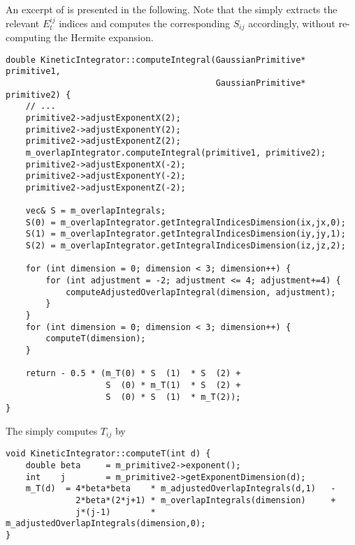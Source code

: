 \documentclass[../../master.tex]{subfiles}
\begin{document}
An excerpt of  is presented in the following. Note that the  simply extracts the relevant $E_t^{ij}$ indices and computes the corresponding $S_{ij}$ accordingly, without re-computing the Hermite expansion.
\begin{lstlisting}[language={[std]c++}]
double KineticIntegrator::computeIntegral(GaussianPrimitive* primitive1,
                                          GaussianPrimitive* primitive2) {
    // ...
    primitive2->adjustExponentX(2);
    primitive2->adjustExponentY(2);
    primitive2->adjustExponentZ(2);
    m_overlapIntegrator.computeIntegral(primitive1, primitive2);
    primitive2->adjustExponentX(-2);
    primitive2->adjustExponentY(-2);
    primitive2->adjustExponentZ(-2);

    vec& S = m_overlapIntegrals;
    S(0) = m_overlapIntegrator.getIntegralIndicesDimension(ix,jx,0);
    S(1) = m_overlapIntegrator.getIntegralIndicesDimension(iy,jy,1);
    S(2) = m_overlapIntegrator.getIntegralIndicesDimension(iz,jz,2);

    for (int dimension = 0; dimension < 3; dimension++) {
        for (int adjustment = -2; adjustment <= 4; adjustment+=4) {
            computeAdjustedOverlapIntegral(dimension, adjustment);
        }
    }
    for (int dimension = 0; dimension < 3; dimension++) {
        computeT(dimension);
    }

    return - 0.5 * (m_T(0) * S  (1)  * S  (2) +
                    S  (0) * m_T(1)  * S  (2) +
                    S  (0) * S  (1)  * m_T(2));
}
\end{lstlisting}
The  simply computes $T_{ij}$ by 
\begin{lstlisting}[language={[std]c++}]
void KineticIntegrator::computeT(int d) {
    double beta     = m_primitive2->exponent();
    int    j        = m_primitive2->getExponentDimension(d);
    m_T(d)  = 4*beta*beta    * m_adjustedOverlapIntegrals(d,1)   -
              2*beta*(2*j+1) * m_overlapIntegrals(dimension)     +
              j*(j-1)        * m_adjustedOverlapIntegrals(dimension,0);
}
\end{lstlisting}

\renewcommand{\R}{{\bf R}}
\end{document}
